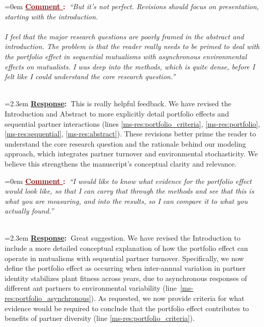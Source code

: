 \documentclass[12pt]{article}
\newcounter{cN}
\newcommand{\comment}[1]{
	\vspace{2em}
	\refstepcounter{cN} %
	\noindent \hangindent=0em \textbf{\textcolor{Maroon}{\uline{Comment \thecN}:~}}\emph{``#1''}
	}
\newcommand{\response}[1]{
	\\[0.25em]
	\hangindent=2.3em \textbf{\textcolor{NavyBlue}{\uline{Response}:~}}#1
	}
\begin{document}
\comment{But it's not perfect. Revisions should focus on presentation, starting with the introduction.
\\
\\
I feel that the major research questions are poorly framed in the abstract and introduction. 
The problem is that the reader really needs to be primed to deal with the portfolio effect in sequential mutualisms with asynchronous environmental effects on mutualists. 
I was deep into the methods, which is quite dense, before I felt like I could understand the core research question.}
\response{This is really helpful feedback. 
	We have revised the Introduction and Abstract to more explicitly detail portfolio effects and sequential partner interactions (lines \ref{ms-res:portfolio_criteria}, \ref{ms-res:portfolio},\ref{ms-res:sequential}, \ref{ms-res:abstract}).
	These revisions better prime the reader to understand the core research question and the rationale behind our modeling approach, which integrates partner turnover and environmental stochasticity. 
	We believe this strengthens the manuscript’s conceptual clarity and relevance.}

\comment{I would like to know what evidence for the portfolio effect would look like, so that I can carry that through the methods and see that this is what you are measuring, and into the results, so I can compare it to what you actually found.}
\response{Great suggestion. 
	We have revised the Introduction to include a more detailed conceptual explanation of how the portfolio effect can operate in mutualisms with sequential partner turnover. 
	Specifically, we now define the portfolio effect as occurring when inter-annual variation in partner identity stabilizes plant fitness across years, due to asynchronous responses of different ant partners to environmental variability (line~\ref{ms-res:portfolio_asynchronous}).
	As requested, we now provide criteria for what evidence would be required to conclude that the portfolio effect contributes to benefits of partner diversity (line \ref{ms-res:portfolio_criteria}).}
\end{document}
